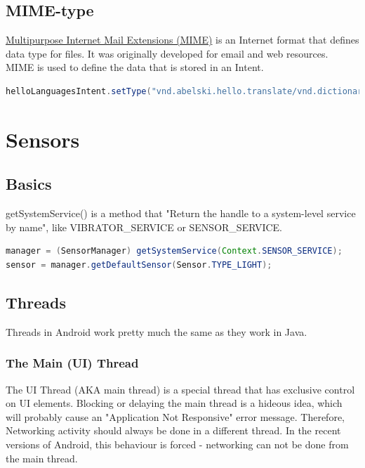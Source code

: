 \documentclass{article}
\begin{document}
\subsection{MIME-type}
\href{http://en.wikipedia.org/wiki/MIME}{Multipurpose Internet Mail Extensions (MIME)} is an Internet format that defines data type for files. It was originally developed for email and web resources. MIME is used to define the data that is stored in an Intent.

\begin{code} \begin{lstlisting}[language=Java]
helloLanguagesIntent.setType("vnd.abelski.hello.translate/vnd.dictionary");
\end{lstlisting} \end{code}

\section{Sensors}

\subsection{Basics}

getSystemService() is a method that "Return the handle to a system-level service by name", like VIBRATOR\_SERVICE or SENSOR\_SERVICE.

\begin{code} \begin{lstlisting}[language=Java]
manager = (SensorManager) getSystemService(Context.SENSOR_SERVICE);
sensor = manager.getDefaultSensor(Sensor.TYPE_LIGHT);
\end{lstlisting} \end{code}


\subsection{Threads}
Threads in Android work pretty much the same as they work in Java.

\subsubsection{The Main (UI) Thread}
The UI Thread (AKA main thread) is a special thread that has exclusive control on UI elements. Blocking or delaying the main thread is a hideous idea, which will probably cause an "Application Not Responsive" error message. Therefore, Networking activity should always be done in a different thread. In the recent versions of Android, this behaviour is forced - networking can not be done from the main thread.
\end{document}
